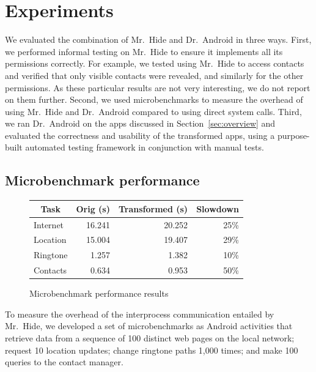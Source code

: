 \documentclass[preprint]{sig-alternate-10pt}
\newcommand{\lib}{Mr.\ Hide\xspace}
\newcommand{\rewriter}{Dr.\ Android\xspace}
\begin{document}
\section{Experiments}
\label{sec:eval}

We evaluated the combination of \lib and \rewriter in three ways. 
First, we performed informal testing on \lib to ensure it implements all
its permissions correctly. For example, we tested using \lib to access
contacts and verified that only visible contacts were revealed, and
similarly for the other permissions.  As these particular results are not very
interesting, we do not report on them further.
Second,
we used microbenchmarks to measure the overhead of using \lib and
\rewriter compared to using direct system calls.
%
%
Third, we ran
\rewriter on the apps discussed in Section~\ref{sec:overview} and
evaluated the correctness and usability of the transformed apps, using
a purpose-built automated testing framework in conjunction with manual
tests.



\subsection{Microbenchmark performance}
\label{sec:micro}


\begin{figure}[t!]
  \centering
  \small
  \begin{tabular}{|lrrr|} \hline
    \multicolumn{1}{|c}{\textbf{Task}} &
    \multicolumn{1}{c}{\textbf{Orig (s)}} &
    \multicolumn{1}{c}{\textbf{Transformed (s)}} &
    \multicolumn{1}{c|}{\textbf{Slowdown}} \\ \hline
    Internet & 16.241 & 20.252 & 25\% \\
    Location & 15.004 & 19.407 & 29\% \\
    Ringtone &  1.257 &  1.382 & 10\% \\
    Contacts &  0.634 &  0.953 & 50\% \\ \hline
  \end{tabular}
  \caption{Microbenchmark performance results}
  \label{fig:microbenchmark}
\end{figure}


To measure the overhead of the interprocess communication entailed by
\lib, we developed a set of microbenchmarks as Android
activities that retrieve data from a sequence of 100
distinct web pages on the local network; request 10 location updates;
change ringtone paths 1,000 times; and make 100 queries to the contact
manager.   
\end{document}
